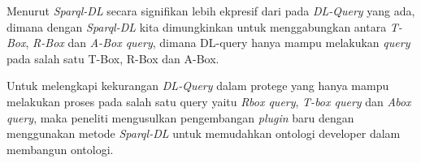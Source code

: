 Menurut \citet{evren_parsia} \emph{Sparql-DL} secara signifikan lebih ekpresif dari pada \emph{DL-Query} yang ada, dimana dengan \emph{Sparql-DL} kita dimungkinkan untuk menggabungkan antara \emph{T-Box}, \emph{R-Box} dan \emph{A-Box query}, dimana DL-query hanya mampu melakukan \emph{query} pada salah satu T-Box, R-Box dan A-Box.

Untuk melengkapi kekurangan \emph{DL-Query} dalam protege yang hanya mampu melakukan proses pada salah satu query yaitu \emph{Rbox query}, \emph{T-box query} dan \emph{Abox query}, maka peneliti mengusulkan pengembangan \emph{plugin} baru dengan menggunakan metode \emph{Sparql-DL} untuk memudahkan ontologi developer dalam membangun ontologi.

